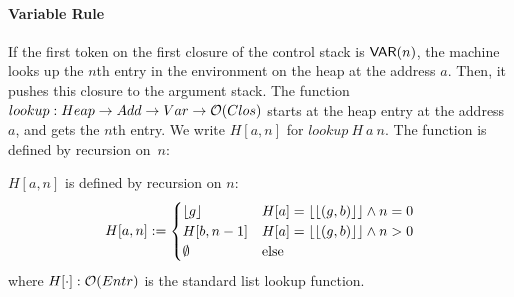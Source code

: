 \paragraph{Variable Rule}
If the first token on the first closure of the control stack is $\mathsf{VAR}(n)$, the machine looks up the $n$th entry in the environment on the heap at
the address $a$.  Then, it pushes this closure to the argument stack.  The function $lookup : Heap \rightarrow Add \rightarrow Var \rightarrow \mathcal{O}(Clos)$ starts at the
heap entry at the address $a$, and gets the $n$th entry. We write $H[a,n]$ for $lookup~H~a~n$.  The function is defined by recursion on~$n$:
\begin{definition}[$lookup$][lookup]
  \label{def:lookup}
  $H[a,n]$ is defined by recursion on $n$:
  \[
    H[a,n] :=
    \begin{cases}
      \left\lfloor {g} \right\rfloor & H[a]=\left\lfloor {\left\lfloor {(g,b)} \right\rfloor} \right\rfloor \land n=0 \\
      H[b,n-1] & H[a]=\left\lfloor {\left\lfloor {(g,b)} \right\rfloor} \right\rfloor \land n>0 \\
      \emptyset & \text{else}
    \end{cases}
  \]
  where $H[\cdot] : \mathcal{O}(Entr)$ is the standard list lookup function.
\end{definition}


